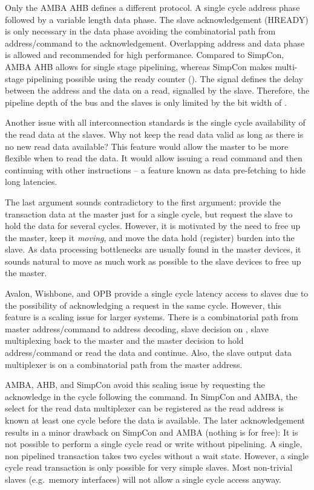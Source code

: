 Only the AMBA AHB \cite{soc:amba} defines a different protocol. A
single cycle address phase followed by a variable length data phase.
The slave acknowledgement (HREADY) is only necessary in the data
phase avoiding the combinatorial path from address/command to the
acknowledgement. Overlapping address and data phase is allowed and
recommended for high performance. Compared to SimpCon, AMBA AHB
allows for single stage pipelining, whereas SimpCon makes multi-stage
pipelining possible using the ready counter (). The
 signal defines the delay between the address and the
data on a read, signalled by the slave. Therefore, the pipeline depth
of the bus and the slaves is only limited by the bit width of
.


Another issue with all interconnection standards is the single cycle
availability of the read data at the slaves. Why not keep the read
data valid as long as there is no new read data available? This
feature would allow the master to be more flexible when to read the
data. It would allow issuing a read command and then continuing with
other instructions -- a feature known as data pre-fetching to hide
long latencies.

The last argument sounds contradictory to the first argument: provide
the transaction data at the master just for a single cycle, but
request the slave to hold the data for several cycles. However, it is
motivated by the need to free up the master, keep it \emph{moving},
and move the data hold (register) burden into the slave. As data
processing bottlenecks are usually found in the master devices, it
sounds natural to move as much work as possible to the slave devices
to free up the master.

Avalon, Wishbone, and OPB provide a single cycle latency access to
slaves due to the possibility of acknowledging a request in the same
cycle. However, this feature is a scaling issue for larger systems.
There is a combinatorial path from master address/command to address
decoding, slave decision on , slave  multiplexing
back to the master and the master decision to hold address/command or
read the data and continue. Also, the slave output data multiplexer
is on a combinatorial path from the master address.

AMBA, AHB, and SimpCon avoid this scaling issue by requesting the
acknowledge in the cycle following the command. In SimpCon and AMBA,
the select for the read data multiplexer can be registered as the
read address is known at least one cycle before the data is
available. The later acknowledgement results in a minor drawback on
SimpCon and AMBA (nothing is for free): It is not possible to perform
a single cycle read or write without pipelining. A single, non
pipelined transaction takes two cycles without a wait state. However,
a single cycle read transaction is only possible for very simple
slaves. Most non-trivial slaves (e.g.\ memory interfaces) will not
allow a single cycle access anyway.

